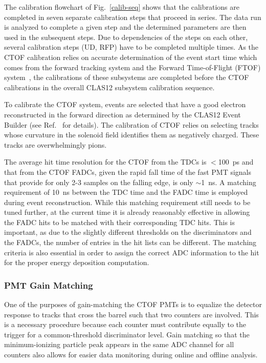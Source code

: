 \documentclass[3p,times,twocolumn]{elsarticle}
\begin{document}
The calibration flowchart of Fig.~\ref{calib-seq} shows that the calibrations are completed in seven separate
calibration steps that proceed in series. The data run is analyzed to complete a given step and the determined
parameters are then used in the subsequent steps. Due to dependencies of the steps on each other, several
calibration steps (UD, RFP) have to be completed multiple times. As the CTOF calibration relies on accurate
determination of the event start time which comes from the forward tracking system and the Forward
Time-of-Flight (FTOF) system~\cite{ftof-nim}, the calibrations of these subsystems are completed before the
CTOF calibrations in the overall CLAS12 subsystem calibration sequence.

To calibrate the CTOF system, events are selected that have a good electron reconstructed in the forward
direction as determined by the CLAS12 Event Builder (see Ref.~\cite{recon-nim} for details). The calibration
of CTOF relies on selecting tracks whose curvature in the solenoid field identifies them as negatively charged.
These tracks are overwhelmingly pions.

The average hit time resolution for the CTOF from the TDCs is $<$100~ps and that from the CTOF
FADCs, given the rapid fall time of the fast PMT signals that provide for only 2-3 samples on the falling
edge, is only $\sim$1~ns. A matching requirement of 10~ns between the TDC time and the FADC time is
employed during event reconstruction. While this matching requirement still needs to be tuned further,
at the current time it is already reasonably effective in allowing the FADC hits to be matched with their
corresponding TDC hits. This is important, as due to the slightly different thresholds on the discriminators
and the FADCs, the number of entries in the hit lists can be different. The matching criteria is also essential
in order to assign the correct ADC information to the hit for the proper energy deposition computation.

\subsubsection{PMT Gain Matching}
\label{gain-matching}

One of the purposes of gain-matching the CTOF PMTs is to equalize the detector response to tracks that
cross the barrel such that two counters are involved. This is a necessary procedure because each counter
must contribute equally to the trigger for a common-threshold discriminator level. Gain matching so that
the minimum-ionizing particle peak appears in the same ADC channel for all counters also allows for easier
data monitoring during online and offline analysis.
\end{document}
